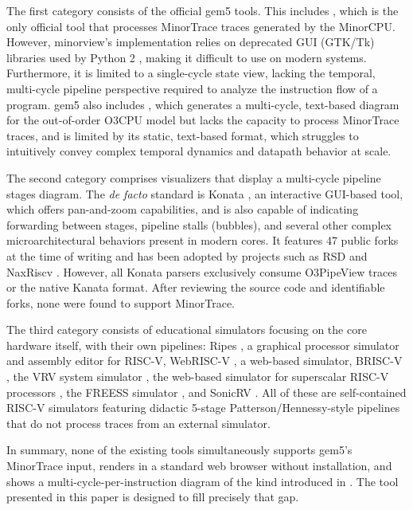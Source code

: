 \documentclass[runningheads,a4paper]{llncs}
\begin{document}
The first category consists of the official gem5 tools. This includes , which is the only official tool that processes MinorTrace traces generated by the MinorCPU. However, minorview's implementation relies on deprecated GUI (GTK/Tk) libraries used by Python 2 \cite{minorviewGtkSrc,gnome_pygobject_porting}, making it difficult to use on modern systems. Furthermore, it is limited to a single-cycle state view, lacking the temporal, multi-cycle pipeline perspective required to analyze the instruction flow of a program. gem5 also includes , which generates a multi-cycle, text-based diagram for the out-of-order O3CPU model \cite{gem5o3cpu} but lacks the capacity to process MinorTrace traces, and is limited by its static, text-based format, which struggles to intuitively convey complex temporal dynamics and datapath behavior at scale.

The second category comprises visualizers that display a multi-cycle pipeline stages diagram. The \textit{de facto} standard is Konata \cite{shioya2025konata}, an interactive GUI-based tool, which offers pan-and-zoom capabilities, and is also capable of indicating forwarding between stages, pipeline stalls (bubbles), and several other complex microarchitectural behaviors present in modern cores. It features 47 public forks at the time of writing and has been adopted by projects such as RSD \cite{mashimo2019open} and NaxRiscv \cite{NaxRiscv}. However, all Konata parsers exclusively consume O3PipeView traces or the native Kanata format. After reviewing the source code and identifiable forks, none were found to support MinorTrace.

The third category consists of educational simulators focusing on the core hardware itself, with their own pipelines: Ripes \cite{petersen2021ripes}, a graphical processor simulator and assembly editor for RISC-V, WebRISC-V \cite{giorgi2019webrisc,giorgi2025webrisc}, a web-based simulator, BRISC-V \cite{bandara2019brisc}, the VRV system simulator \cite{krim2025vrv}, the web-based simulator for superscalar RISC-V processors \cite{jaros2024web}, the FREESS simulator \cite{giorgi2025freess}, and SonicRV \cite{grosse2026sonicrv}. All of these are self-contained RISC-V simulators featuring didactic 5-stage Patterson/Hennessy-style pipelines that do not process traces from an external simulator.

In summary, none of the existing tools simultaneously supports gem5's MinorTrace input, renders in a standard web browser without installation, and shows a multi-cycle-per-instruction diagram of the kind introduced in \cite{patterson2020computer}. The tool presented in this paper is designed to fill precisely that gap.
\end{document}
